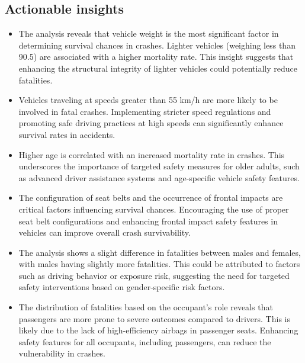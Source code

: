 \documentclass[12pt,a4paper]{article}
\begin{document}
	\subsection{Actionable insights}
	\begin{itemize}
	\item The analysis reveals that vehicle weight is the most significant factor in determining survival chances in crashes. Lighter vehicles (weighing less than 90.5) are associated with a higher mortality rate. This insight suggests that enhancing the structural integrity of lighter vehicles could potentially reduce fatalities.
	\item Vehicles traveling at speeds greater than 55 km/h are more likely to be involved in fatal crashes. Implementing stricter speed regulations and promoting safe driving practices at high speeds can significantly enhance survival rates in accidents.
	\item Higher age is correlated with an increased mortality rate in crashes. This underscores the importance of targeted safety measures for older adults, such as advanced driver assistance systems and age-specific vehicle safety features.
	
	\item The configuration of seat belts and the occurrence of frontal impacts are critical factors influencing survival chances. Encouraging the use of proper seat belt configurations and enhancing frontal impact safety features in vehicles can improve overall crash survivability.
	
	\item The analysis shows a slight difference in fatalities between males and females, with males having slightly more fatalities. This could be attributed to factors such as driving behavior or exposure risk, suggesting the need for targeted safety interventions based on gender-specific risk factors.
	
	\item The distribution of fatalities based on the occupant's role reveals that passengers are more prone to severe outcomes compared to drivers. This is likely due to the lack of high-efficiency airbags in passenger seats. Enhancing safety features for all occupants, including passengers, can reduce the vulnerability in crashes.
	
	
		
	\end{itemize}
	
\end{document}
